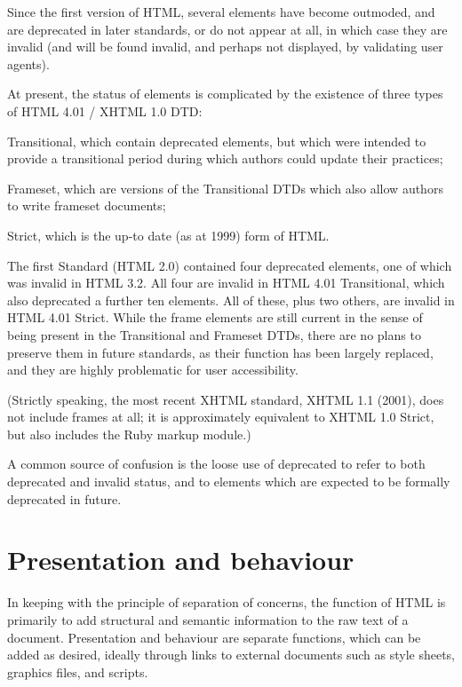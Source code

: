 Since the first version of HTML, several elements have become outmoded, and are deprecated in later standards, or do not appear at all, in which case they are invalid (and will be found invalid, and perhaps not displayed, by validating user agents).

At present, the status of elements is complicated by the existence of three types of HTML 4.01 / XHTML 1.0 DTD:

\begin{compactitem}
\item Transitional, which contain deprecated elements, but which were intended to provide a transitional period during which authors could update their practices;
\item Frameset, which are versions of the Transitional DTDs which also allow authors to write frameset documents;
\item Strict, which is the up-to date (as at 1999) form of HTML.
\end{compactitem}

The first Standard (HTML 2.0) contained four deprecated elements, one of which was invalid in HTML 3.2. All four are invalid in HTML 4.01 Transitional, which also deprecated a further ten elements. All of these, plus two others, are invalid in HTML 4.01 Strict. While the frame elements are still current in the sense of being present in the Transitional and Frameset DTDs, there are no plans to preserve them in future standards, as their function has been largely replaced, and they are highly problematic for user accessibility.


(Strictly speaking, the most recent XHTML standard, XHTML 1.1 (2001), does not include frames at all; it is approximately equivalent to XHTML 1.0 Strict, but also includes the Ruby markup module.)

A common source of confusion is the loose use of deprecated to refer to both deprecated and invalid status, and to elements which are expected to be formally deprecated in future.

\section{Presentation and behaviour}





In keeping with the principle of separation of concerns, the function of HTML is primarily to add structural and semantic information to the raw text of a document. Presentation and behaviour are separate functions, which can be added as desired, ideally through links to external documents such as style sheets, graphics files, and scripts.

